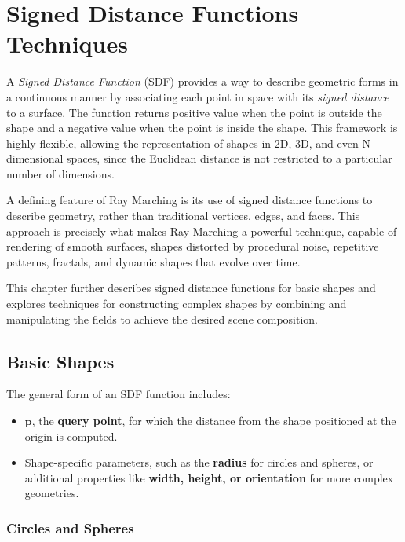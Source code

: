 \chapter{Signed Distance Functions Techniques}\label{chp:LABEL_CHP_2}

A \textit{Signed Distance Function} (SDF) provides a way to describe geometric forms in a continuous manner by associating each point in space with its \textit{signed distance} to a surface. The function returns positive value when the point is outside the shape and a negative value when the point is inside the shape. This framework is highly flexible, allowing the representation of shapes in 2D, 3D, and even N-dimensional spaces, since the Euclidean distance is not restricted to a particular number of dimensions.  

A defining feature of Ray Marching is its use of signed distance functions to describe geometry, rather than traditional vertices, edges, and faces. This approach is precisely what makes Ray Marching a powerful technique, capable of rendering of smooth surfaces, shapes distorted by procedural noise, repetitive patterns, fractals, and dynamic shapes that evolve over time.
    
This chapter further describes signed distance functions for basic shapes and explores techniques for constructing complex shapes by combining and manipulating the fields to achieve the desired scene composition.


\section{Basic Shapes}


The general form of an SDF function includes:  

\begin{itemize}
    \item $\mathbf{p}$, the \textbf{query point}, for which the distance from the shape positioned at the origin is computed.
    \item Shape-specific parameters, such as the \textbf{radius} for circles and spheres, or additional properties like \textbf{width, height, or orientation} for more complex geometries.
\end{itemize}

\subsection{Circles and Spheres}

